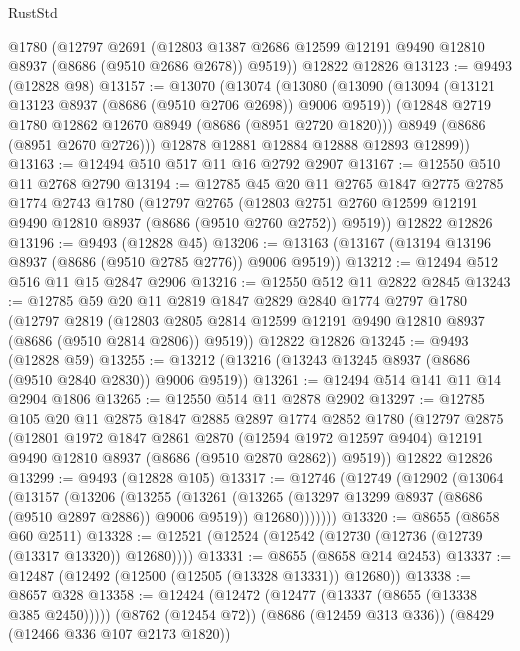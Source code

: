 \begin{lexlean}{RustStd}
\begin{coremodule}
    @1780
    (@12797
      @2691
      (@12803 @1387 @2686 @12599 @12191 @9490 @12810 @8937 (@8686 (@9510 @2686 @2678)) @9519))
    @12822
    @12826
@13123 := @9493 (@12828 @98)
@13157 := @13070
    (@13074
      (@13080
        (@13090
          (@13094 (@13121 @13123 @8937 (@8686 (@9510 @2706 @2698)) @9006 @9519))
          (@12848 @2719 @1780 @12862 @12670 @8949 (@8686 (@8951 @2720 @1820)))
          @8949
          (@8686 (@8951 @2670 @2726)))
        @12878
        @12881
        @12884
        @12888
        @12893
        @12899))
@13163 := @12494 @510 @517 @11 @16 @2792 @2907
@13167 := @12550 @510 @11 @2768 @2790
@13194 := @12785
    @45
    @20
    @11
    @2765
    @1847
    @2775
    @2785
    @1774
    @2743
    @1780
    (@12797
      @2765
      (@12803 @2751 @2760 @12599 @12191 @9490 @12810 @8937 (@8686 (@9510 @2760 @2752)) @9519))
    @12822
    @12826
@13196 := @9493 (@12828 @45)
@13206 := @13163 (@13167 (@13194 @13196 @8937 (@8686 (@9510 @2785 @2776)) @9006 @9519))
@13212 := @12494 @512 @516 @11 @15 @2847 @2906
@13216 := @12550 @512 @11 @2822 @2845
@13243 := @12785
    @59
    @20
    @11
    @2819
    @1847
    @2829
    @2840
    @1774
    @2797
    @1780
    (@12797
      @2819
      (@12803 @2805 @2814 @12599 @12191 @9490 @12810 @8937 (@8686 (@9510 @2814 @2806)) @9519))
    @12822
    @12826
@13245 := @9493 (@12828 @59)
@13255 := @13212 (@13216 (@13243 @13245 @8937 (@8686 (@9510 @2840 @2830)) @9006 @9519))
@13261 := @12494 @514 @141 @11 @14 @2904 @1806
@13265 := @12550 @514 @11 @2878 @2902
@13297 := @12785
    @105
    @20
    @11
    @2875
    @1847
    @2885
    @2897
    @1774
    @2852
    @1780
    (@12797
      @2875
      (@12801
        @1972
        @1847
        @2861
        @2870
        (@12594 @1972 @12597 @9404)
        @12191
        @9490
        @12810
        @8937
        (@8686 (@9510 @2870 @2862))
        @9519))
    @12822
    @12826
@13299 := @9493 (@12828 @105)
@13317 := @12746
    (@12749
      (@12902
        (@13064
          (@13157
            (@13206
              (@13255
                (@13261
                  (@13265 (@13297 @13299 @8937 (@8686 (@9510 @2897 @2886)) @9006 @9519))
                  @12680)))))))
@13320 := @8655 (@8658 @60 @2511)
@13328 := @12521 (@12524 (@12542 (@12730 (@12736 (@12739 (@13317 @13320)) @12680))))
@13331 := @8655 (@8658 @214 @2453)
@13337 := @12487 (@12492 (@12500 (@12505 (@13328 @13331)) @12680))
@13338 := @8657 @328
@13358 := @12424
    (@12472 (@12477 (@13337 (@8655 (@13338 @385 @2450)))))
    (@8762 (@12454 @72))
    (@8686 (@12459 @313 @336))
    (@8429 (@12466 @336 @107 @2173 @1820))

\end{coremodule}
\end{lexlean}
